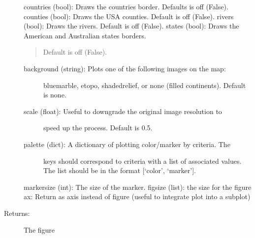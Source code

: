 \documentclass[letterpaper,10pt,english]{sphinxmanual}
\begin{document}
\begin{fulllineitems}
\begin{description}
\begin{description}
\end{description}

countries (bool): Draws the countries border. Defaults is off (False). 
counties (bool): Draws the USA counties. Default is off (False).
rivers (bool): Draws the rivers. Default is off (False).
states (bool): Draws the American and Australian states borders.
\begin{quote}

Default is off (False).
\end{quote}
\begin{description}
\item[{background (string): Plots one of the following images on the map: }] \leavevmode
bluemarble, etopo, shadedrelief, or none (filled continents). 
Default is none.

\item[{scale (float): Useful to downgrade the original image resolution to}] \leavevmode
speed up the process. Default is 0.5.

\item[{palette (dict): A dictionary of plotting color/marker by criteria. The}] \leavevmode
keys should correspond to  criteria with a list of 
associated values. The list should be in the format 
{[}‘color’, ‘marker’{]}.

\end{description}

markersize (int): The size of the marker.
figsize (list): the size for the figure
ax: Return as axis instead of figure (useful to integrate plot into a subplot)

\item[{Returns:}] \leavevmode
The figure

\end{description}

\end{fulllineitems}

\end{document}
